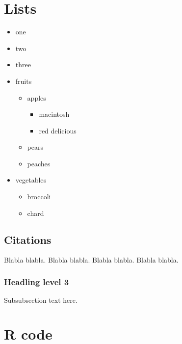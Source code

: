 \documentclass[]{rsos}%
\begin{document}
\hypertarget{lists}{%
\section{Lists}\label{lists}}

\begin{itemize}
\item
  one
\item
  two
\item
  three
\item
  fruits

  \begin{itemize}
  \tightlist
  \item
    apples

    \begin{itemize}
    \tightlist
    \item
      macintosh
    \item
      red delicious
    \end{itemize}
  \item
    pears
  \item
    peaches
  \end{itemize}
\item
  vegetables

  \begin{itemize}
  \tightlist
  \item
    broccoli
  \item
    chard
  \end{itemize}
\end{itemize}

\hypertarget{citations}{%
\subsection{Citations}\label{citations}}

Blabla \cite{Lannes} blabla. Blabla \cite{HJ2} blabla. Blabla \cite{BF, Lannes} blabla. Blabla \cite{Benjamin1967, HJ2, HJ3, HP2} blabla.

\hypertarget{headling-level-3}{%
\subsubsection{Headling level 3}\label{headling-level-3}}

Subsubsection text here.

\hypertarget{r-code}{%
\section{R code}\label{r-code}}
\end{document}
